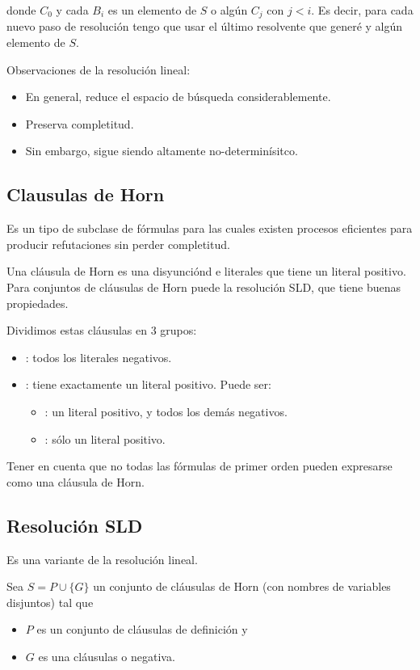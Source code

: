 donde $C_0$ y cada $B_i$ es un elemento de $S$ o algún $C_j$ con $j < i$. Es decir, para cada nuevo paso de resolución tengo que usar el último resolvente que generé y algún elemento de $S$.

Observaciones de la resolución lineal:
\begin{itemize}
  \item En general, reduce el espacio de búsqueda considerablemente.
  \item Preserva completitud.
  \item Sin embargo, sigue siendo altamente no-determinísitco.
\end{itemize}

\subsection{Clausulas de Horn}

Es un tipo de subclase de fórmulas para las cuales existen procesos eficientes para producir refutaciones sin perder completitud.

Una cláusula de Horn es una disyunciónd e literales que tiene  un literal positivo. Para conjuntos de cláusulas de Horn puede la resolución SLD, que tiene buenas propiedades.

Dividimos estas cláusulas en 3 grupos:
\begin{itemize}
  \item {}: todos los literales negativos.
  \item {}: tiene exactamente un literal positivo. Puede ser:
    \begin{itemize}
      \item {}: un literal positivo, y todos los demás negativos.
      \item {}: sólo un literal positivo.
    \end{itemize}
\end{itemize}

Tener en cuenta que no todas las fórmulas de primer orden pueden expresarse como una cláusula de Horn.

\subsection{Resolución SLD}

Es una variante de la resolución lineal.

Sea $S = P \cup \{G\}$ un conjunto de cláusulas de Horn (con nombres de variables disjuntos) tal que
\begin{itemize}
  \item $P$ es un conjunto de cláusulas de definición y
  \item $G$ es una cláusulas  o negativa.
\end{itemize}

